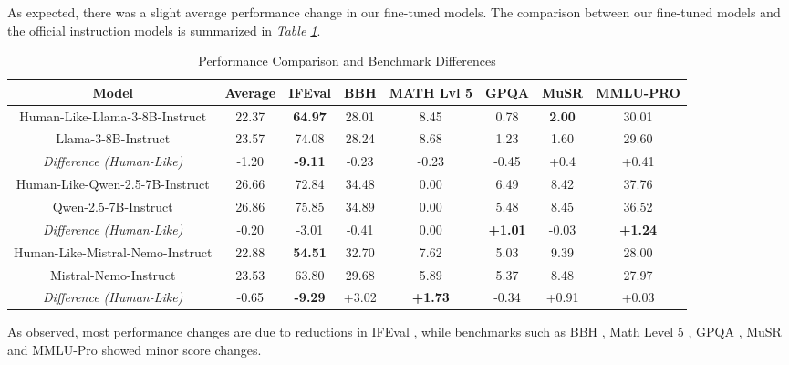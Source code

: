 \documentclass{article}
\begin{document}
As expected, there was a slight average performance change in our fine-tuned models. The comparison between our fine-tuned models and the official instruction models is summarized in \textit{Table \ref{tab:combined_leaderboard}}.

\begin{table}[h!]
\centering
\begin{tabular}{c|c|cccccc}
\toprule
\textbf{Model} & \textbf{Average} & \textbf{IFEval} & \textbf{BBH} & \textbf{MATH Lvl 5} & \textbf{GPQA} & \textbf{MuSR} & \textbf{MMLU-PRO} \\
\midrule
Human-Like-Llama-3-8B-Instruct & 22.37 & \textbf{64.97} & 28.01 & 8.45 & 0.78 & \textbf{2.00} & 30.01 \\
Llama-3-8B-Instruct & 23.57 & 74.08 & 28.24 & 8.68 & 1.23 & 1.60 & 29.60 \\ 
\textit{Difference (Human-Like)} & -1.20 & \textbf{-9.11} & -0.23 & -0.23 & -0.45 & +0.4 & +0.41 \\
\midrule
Human-Like-Qwen-2.5-7B-Instruct & 26.66 & 72.84 & 34.48 & 0.00 & 6.49 & 8.42 & 37.76 \\
Qwen-2.5-7B-Instruct & 26.86 & 75.85 & 34.89 & 0.00 & 5.48 & 8.45 & 36.52 \\ 
\textit{Difference (Human-Like)} & -0.20 & -3.01 & -0.41 & 0.00 & \textbf{+1.01} & -0.03 & \textbf{+1.24} \\
\midrule
Human-Like-Mistral-Nemo-Instruct & 22.88 & \textbf{54.51} & 32.70 & 7.62 & 5.03 & 9.39 & 28.00 \\
Mistral-Nemo-Instruct & 23.53 & 63.80 & 29.68 & 5.89 & 5.37 & 8.48 & 27.97 \\
\textit{Difference (Human-Like)} & -0.65 & \textbf{-9.29} & +3.02 & \textbf{+1.73} & -0.34 & +0.91 & +0.03 \\
\bottomrule
\end{tabular}
\vspace{0.3cm}
\caption{Performance Comparison and Benchmark Differences}
\label{tab:combined_leaderboard}
\end{table}

    As observed, most performance changes are due to reductions in IFEval \cite{zhou2023instructionfollowingevaluationlargelanguage}, while benchmarks such as BBH \cite{suzgun2022challengingbigbenchtaskschainofthought}, Math Level 5 \cite{hendrycks2021measuringmathematicalproblemsolving}, GPQA \cite{rein2023gpqagraduatelevelgoogleproofqa}, MuSR \cite{sprague2024musrtestinglimitschainofthought} and MMLU-Pro \cite{wang2024mmluprorobustchallengingmultitask} showed minor score changes.
\end{document}
